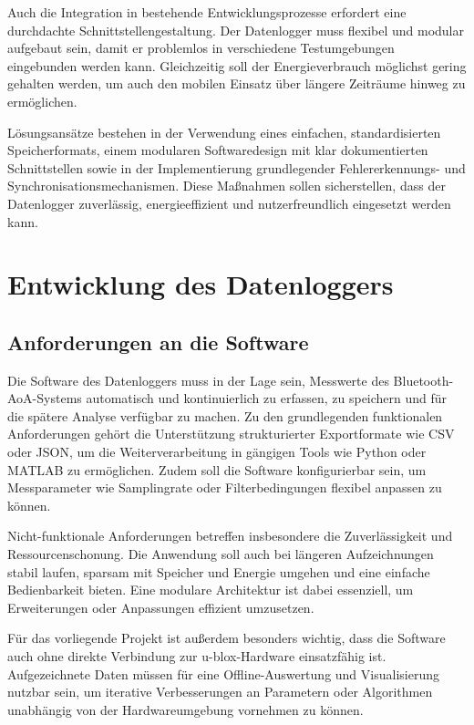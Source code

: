 \documentclass[a4paper, 12pt]{article} %
\begin{document}
Auch die Integration in bestehende Entwicklungsprozesse erfordert eine durchdachte Schnittstellengestaltung.
 Der Datenlogger muss flexibel und modular aufgebaut sein, damit er problemlos in verschiedene Testumgebungen 
 eingebunden werden kann. Gleichzeitig soll der Energieverbrauch möglichst gering gehalten werden, um auch den mobilen Einsatz über längere
  Zeiträume hinweg zu ermöglichen.

Lösungsansätze bestehen in der Verwendung eines einfachen, standardisierten Speicherformats, einem modularen 
Softwaredesign mit klar dokumentierten Schnittstellen sowie in der Implementierung grundlegender Fehlererkennungs- und Synchronisationsmechanismen. 
Diese Maßnahmen sollen sicherstellen, dass der Datenlogger zuverlässig, energieeffizient und nutzerfreundlich eingesetzt werden kann.

\clearpage

\section{Entwicklung des Datenloggers}
\subsection{Anforderungen an die Software}
Die Software des Datenloggers muss in der Lage sein, Messwerte des Bluetooth-\ac{AoA}-Systems automatisch und kontinuierlich zu erfassen, zu speichern 
und für die spätere Analyse verfügbar zu machen. Zu den grundlegenden funktionalen Anforderungen gehört die Unterstützung strukturierter Exportformate 
wie \ac{CSV} oder \ac{JSON}, um die Weiterverarbeitung in gängigen Tools wie Python oder MATLAB zu ermöglichen. Zudem soll die Software konfigurierbar sein, 
um Messparameter wie Samplingrate oder Filterbedingungen flexibel anpassen zu können.

Nicht-funktionale Anforderungen betreffen insbesondere die Zuverlässigkeit und Ressourcenschonung. Die Anwendung soll auch bei längeren 
Aufzeichnungen stabil laufen, sparsam mit Speicher und Energie umgehen und eine einfache Bedienbarkeit bieten. Eine modulare Architektur ist dabei 
essenziell, um Erweiterungen oder Anpassungen effizient umzusetzen.

Für das vorliegende Projekt ist außerdem besonders wichtig, dass die Software auch ohne direkte Verbindung zur u-blox-Hardware 
einsatzfähig ist. Aufgezeichnete Daten müssen für eine Offline-Auswertung und Visualisierung nutzbar sein, um iterative Verbesserungen an 
Parametern oder Algorithmen unabhängig von der Hardwareumgebung vornehmen zu können.
\end{document}

